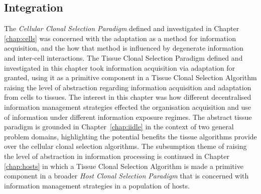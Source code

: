 %
%
\subsection{Integration}
The \emph{Cellular Clonal Selection Paradigm} defined and investigated in Chapter \ref{chap:cells} was concerned with the adaptation as a method for information acquisition, and the how that method is influenced by degenerate information and inter-cell interactions. The Tissue Clonal Selection Paradigm defined and investigated in this chapter took information acquisition via adaptation for granted, using it as a primitive component in a Tissue Clonal Selection Algorithm raising the level of abstraction regarding information acquisition and adaptation from cells to tissues. The interest in this chapter was how different decentralised information management strategies effected the organisation acquisition and use of information under different information exposure regimes. 
The abstract tissue paradigm is grounded in Chapter~\ref{chap:iidle} in the context of two general problem domains, highlighting the potential benefits the tissue algorithms provide over the cellular clonal selection algorithms.
The subsumption theme of raising the level of abstraction in information processing is continued in Chapter \ref{chap:hosts} in which a Tissue Clonal Selection Algorithm is made a primitive component in a broader \emph{Host Clonal Selection Paradigm} that is concerned with information management strategies in a population of hosts.

